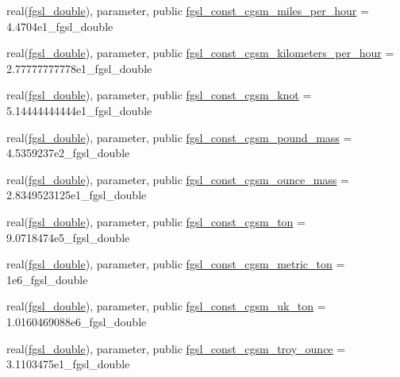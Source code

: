 \begin{DoxyCompactItemize}
\item 
real(\hyperlink{namespacefgsl_a9af5113378e0f000eb479d3f90196ddf}{fgsl\+\_\+double}), parameter, public \hyperlink{namespacefgsl_a021d66524bb3e4b9305ce5399f11f2ec}{fgsl\+\_\+const\+\_\+cgsm\+\_\+miles\+\_\+per\+\_\+hour} = 4.\+4704e1\+\_\+fgsl\+\_\+double
\item 
real(\hyperlink{namespacefgsl_a9af5113378e0f000eb479d3f90196ddf}{fgsl\+\_\+double}), parameter, public \hyperlink{namespacefgsl_a302d497108c596ed552f90c728af3002}{fgsl\+\_\+const\+\_\+cgsm\+\_\+kilometers\+\_\+per\+\_\+hour} = 2.\+77777777778e1\+\_\+fgsl\+\_\+double
\item 
real(\hyperlink{namespacefgsl_a9af5113378e0f000eb479d3f90196ddf}{fgsl\+\_\+double}), parameter, public \hyperlink{namespacefgsl_a7b637a368f16bed373b7ff18193b8417}{fgsl\+\_\+const\+\_\+cgsm\+\_\+knot} = 5.\+14444444444e1\+\_\+fgsl\+\_\+double
\item 
real(\hyperlink{namespacefgsl_a9af5113378e0f000eb479d3f90196ddf}{fgsl\+\_\+double}), parameter, public \hyperlink{namespacefgsl_ae6b5172d0dcea9b11e99852be3ec5f1a}{fgsl\+\_\+const\+\_\+cgsm\+\_\+pound\+\_\+mass} = 4.\+5359237e2\+\_\+fgsl\+\_\+double
\item 
real(\hyperlink{namespacefgsl_a9af5113378e0f000eb479d3f90196ddf}{fgsl\+\_\+double}), parameter, public \hyperlink{namespacefgsl_aef077a68e7fdd2fe6ec932a7f3c1e8bc}{fgsl\+\_\+const\+\_\+cgsm\+\_\+ounce\+\_\+mass} = 2.\+8349523125e1\+\_\+fgsl\+\_\+double
\item 
real(\hyperlink{namespacefgsl_a9af5113378e0f000eb479d3f90196ddf}{fgsl\+\_\+double}), parameter, public \hyperlink{namespacefgsl_a4f163ec06fee37b45bf96990c803601e}{fgsl\+\_\+const\+\_\+cgsm\+\_\+ton} = 9.\+0718474e5\+\_\+fgsl\+\_\+double
\item 
real(\hyperlink{namespacefgsl_a9af5113378e0f000eb479d3f90196ddf}{fgsl\+\_\+double}), parameter, public \hyperlink{namespacefgsl_a6d4725a1ee32c2bf1dcd4aa1d2e00908}{fgsl\+\_\+const\+\_\+cgsm\+\_\+metric\+\_\+ton} = 1e6\+\_\+fgsl\+\_\+double
\item 
real(\hyperlink{namespacefgsl_a9af5113378e0f000eb479d3f90196ddf}{fgsl\+\_\+double}), parameter, public \hyperlink{namespacefgsl_abcaa9958fedcc17e52fb560e58639633}{fgsl\+\_\+const\+\_\+cgsm\+\_\+uk\+\_\+ton} = 1.\+0160469088e6\+\_\+fgsl\+\_\+double
\item 
real(\hyperlink{namespacefgsl_a9af5113378e0f000eb479d3f90196ddf}{fgsl\+\_\+double}), parameter, public \hyperlink{namespacefgsl_aa2e9facb3d97dfb32697727764bbd619}{fgsl\+\_\+const\+\_\+cgsm\+\_\+troy\+\_\+ounce} = 3.\+1103475e1\+\_\+fgsl\+\_\+double

\end{DoxyCompactItemize}
